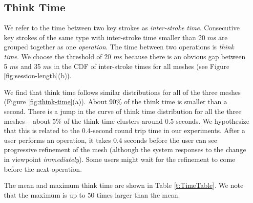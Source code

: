 \subsection{Think Time}
We refer to the time between two key strokes as \textit{inter-stroke time}. Consecutive key strokes of the same type with inter-stroke time smaller than 20 $m$s are grouped together as one \textit{operation}. The time between two operations is \textit{think time}. 
We choose the threshold of 20 $m$s because there is an obvious gap between 5 $m$s and 35 $m$s in the CDF of inter-stroke times for all meshes (see Figure \ref{fig:session-length}(b)).

 


We find that think time follows similar distributions for all of the three meshes (Figure \ref{fig:think-time}(a)). About 90\% of the think time is smaller than a second. There is a jump in the curve of think time distribution for all the three meshes -- about 5\% of the think time clusters around 0.5 seconds. We hypothesize that this is related to the 0.4-second round trip time in our experiments.  After a user performs an operation, it takes 0.4 seconds before the user can see progressive refinement of the mesh (although the system responses to the change in viewpoint \textit{immediately}). Some users might wait for the refinement to come before the next operation.

The mean and maximum think time are shown in Table \ref{t:TimeTable}. We note that the maximum is up to 50 times larger than the mean.

